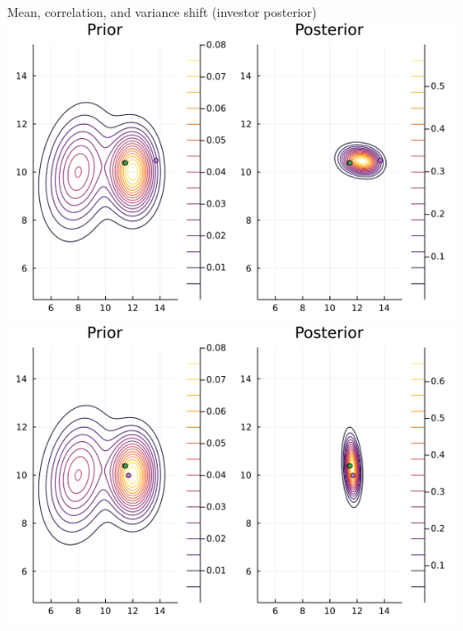 \documentclass[
  ignorenonframetext,
]{beamer}
\begin{document}
\begin{frame}{Mean, correlation, and variance shift (investor
posterior)}
\protect\hypertarget{mean-correlation-and-variance-shift-investor-posterior}{}
\includegraphics[width=0.4\paperwidth]{complexity_files/figure-beamer/unnamed-chunk-14-1}
\includegraphics[width=0.4\paperwidth]{complexity_files/figure-beamer/unnamed-chunk-14-2}
\end{frame}
\end{document}
